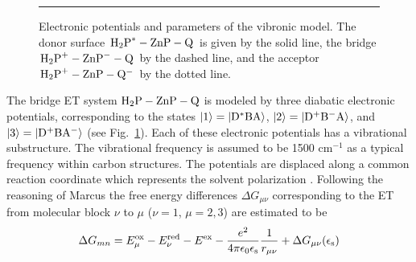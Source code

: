 \documentclass[12pt,twoside,a4paper]{report}
\begin{document}
\begin{footnotesize}\begin{figure}[!h]
  \begin{center}
\parbox{5.0cm}{\rule{-3cm}{.1cm}\epsfxsize=9.0cm}
    \leavevmode
    \caption[Electronic potentials and parameters of the vibronic model.]
      {\small 
          \label{electronic-potentials-fig}
      Electronic potentials and parameters of the vibronic model.
      The donor surface $\left.{\rm H_2P}^*-{\rm ZnP}-{\rm Q}\right.$
      is given by the solid line, the bridge $\left.{\rm H_2P}^+-{\rm
          ZnP}^--{\rm Q}\right.$ by the dashed line, and the acceptor
      $\left.{\rm H_2P}^+-{\rm ZnP}-{\rm Q^-}\right.$ by the dotted
      line. }
  \end{center}
\end{figure}\end{footnotesize}
The bridge ET system ${\rm H_2P}-{\rm ZnP}-{\rm Q}$ 
is modeled by
three diabatic electronic potentials,
corresponding to the  states
$\left|1 \right>=\left|{\rm D}^*{\rm B}  {\rm A  }\right>$,
$\left|2 \right>=\left|{\rm D}^+{\rm B}^-{\rm A  }\right>$, and
$\left|3 \right>=\left|{\rm D}^+{\rm B}  {\rm A^-}\right>$
(see Fig.~\ref{electronic-potentials-fig}).
Each of these electronic potentials has a vibrational substructure.
The vibrational frequency is assumed to be 1500 cm$^{-1}$ as a typical
frequency within carbon structures.  The potentials are displaced
along a common reaction coordinate which represents the solvent
polarization \cite{marc56}.  Following the reasoning of Marcus
\cite{marc56} the free energy differences $\Delta G_{\mu \nu}$ 
corresponding to the ET from molecular block
$\nu$ to  $\mu$
($\nu=1$, $\mu=2,3$)
are estimated to be \cite{fuch96d,r4}
\begin{equation}
  \label{free-energy}
\Delta 
G_{mn} 
       =
             E_\mu^{\rm ox}
          -  E_\nu^{\rm red}
          -  E^{\rm ex}
          -  \frac
                 {e^2}
                 {4\pi\epsilon_0\epsilon_{\rm s}}
             \frac
                 {1}
                 {r_{\mu \nu}}
          +  \Delta G_{\mu \nu}
                     (\epsilon_{\rm s})
\end{equation}
\end{document}

